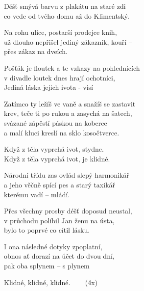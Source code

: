 \ve{}
Déšť smývá barvu z plakátu na staré zdi\\
co vede od tvého domu až do Klimentský. 

Na rohu ulice, postarší prodejce knih,\\
už dlouho nepřišel jediný zákazník, kouří --\\
přes zákaz na dveích. 

Pošťák je floutek a te vzkazy na pohlednicích\\
v divadle loutek dnes hrají ochotníci,\\
Jediná láska jejich ivota - visí \ 

\cho{}
Zatímco ty ležíš ve vaně a snažíš se zastavit\\
krev, teče ti po rukou a zasychá na šatech,\\
svázané zápěstí páskou na koberce\\
a malí kluci kreslí na sklo kosočtverce. 

Když z těla vyprchá ivot, stydne. \\
Když z těla vyprchá ivot, je klidné. 

\ve{}
Národní třídu zas ovlád slepý harmonikář\\
a jeho věčně spící pes a starý taxikář\\
kterému vadí --  mládí.

Přes všechny prosby déšť doposud neustal,\\
v průchodu políbil Jan ženu na ústa,\\
bylo to poprvé co cítil lásku.

I ona následné dotyky zpoplatní, \\
obnos ať dorazí na účet do dvou dní, \\
pak oba splynem -- s plynem 

\cho{}

\re{}
Klidné, klidné, klidné. \ \  \ (4x)

\esong